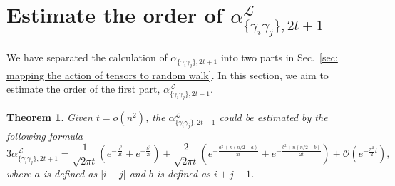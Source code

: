 \documentclass{article}
\newtheorem{theorem}{Theorem}
\newcommand{\alpl}{\alpha_{\{\gamma_i\gamma_j\}, 2t+1}^{\mathscr{L}}}
\begin{document}
\section{Estimate the order of $\alpl$}
\label{sec: estimate the order of alpl}
We have separated the calculation of $\alpha_{\{\gamma_i\gamma_j\},2t+1}$ into two parts in Sec.~\ref{sec: mapping the action of tensors to random walk}. In this section, we aim to estimate the order of the first part, $\alpl$.
\begin{theorem}
\label{theorem: order of alpha l}
    Given $t= o(n^2)$, the $\alpl$ could be estimated by the following formula
    \begin{equation}
        3\alpl = \frac{1}{\sqrt{2\pi t}} (e^{-\frac{a^2}{2t}}+ e^{-\frac{b^2}{2t}}) + \frac{2}{\sqrt{2\pi t}}(e^{-\frac{a^2+n(n/2-a)}{2t}}+ e^{-\frac{b^2+n(n/2-b)}{2t}}) + \mathcal{O}\left(e^{-\frac{\pi^2}{2}t}\right),
    \end{equation}
    where $a$ is defined as $|i-j|$ and $b$ is defined as $i+j-1$.
\end{theorem}
\end{document}

